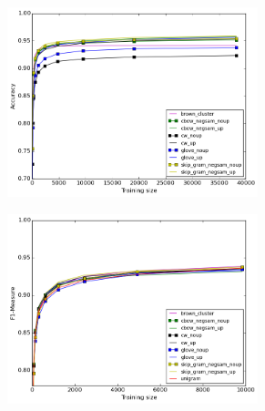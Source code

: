 \begin{figure}[h]
\caption{Best results for each method for POS-Tagging and Chunking}
\centering
\begin{subfigure}{.5\textwidth}
	\centering
    \includegraphics[width=0.8\textwidth]{plots/bestPOS.png}    	
	\label{fig:bestpos}
\end{subfigure}
\begin{subfigure}{.5\textwidth}
	\centering
    \includegraphics[width=0.8\textwidth]{plots/bestChunking.png}
	\label{fig:bestchunking}
\end{subfigure}
\end{figure}

